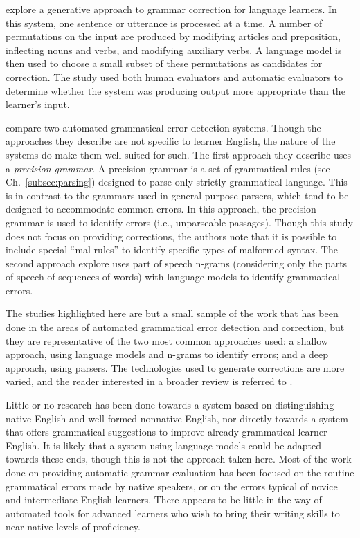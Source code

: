 \documentclass[main.tex]{subfiles}
\begin{document}
\citet{lee:2006} explore a generative approach to grammar correction for language learners. In this system, one sentence or utterance is processed at a time. A number of permutations on the input are produced by modifying articles and preposition, inflecting nouns and verbs, and modifying auxiliary verbs. A language model is then used to choose a small subset of these permutations as candidates for correction. The study used both human evaluators and automatic evaluators to determine whether the system was producing output more appropriate than the learner's input.

\citet{wagner:2007} compare two automated grammatical error detection systems. Though the approaches they describe are not specific to learner English, the nature of the systems do make them well suited for such. The first approach they describe uses a \textit{precision grammar}. A precision grammar is a set of grammatical rules (see Ch.~\ref{subsec:parsing}) designed to parse only strictly grammatical language. This is in contrast to the grammars used in general purpose parsers, which tend to be designed to accommodate common errors. In this approach, the precision grammar is used to identify errors (i.e., unparseable passages). Though this study does not focus on providing corrections, the authors note that it is possible to include special ``mal-rules'' to identify specific types of malformed syntax. The second approach \citeauthor{wagner:2007} explore uses part of speech n-grams (considering only the parts of speech of sequences of words) with language models to identify grammatical errors.

The studies highlighted here are but a small sample of the work that has been done in the areas of automated grammatical error detection and correction, but they are representative of the two most common approaches used: a shallow approach, using language models and n-grams to identify errors; and a deep approach, using parsers. The technologies used to generate corrections are more varied, and the reader interested in a broader review is referred to \citet{lee:2009}.

Little or no research has been done towards a system based on distinguishing native English and well-formed nonnative English, nor directly towards a system that offers grammatical suggestions to improve already grammatical learner English. It is likely that a system using language models could be adapted towards these ends, though this is not the approach taken here. Most of the work done on providing automatic grammar evaluation has been focused on the routine grammatical errors made by native speakers, or on the errors typical of novice and intermediate English learners. There appears to be little in the way of automated tools for advanced learners who wish to bring their writing skills to near-native levels of proficiency.


\biblio
\end{document}
